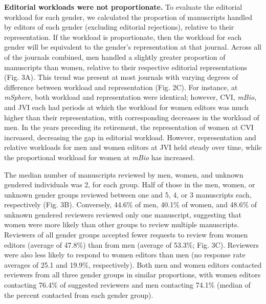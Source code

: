 \documentclass[11pt,]{article}
\begin{document}
\textbf{Editorial workloads were not proportionate.} To evaluate the
editorial workload for each gender, we calculated the proportion of
manuscripts handled by editors of each gender (excluding editorial
rejections), relative to their representation. If the workload is
proportionate, then the workload for each gender will be equivalent to
the gender's representation at that journal. Across all of the journals
combined, men handled a slightly greater proportion of manuscripts than
women, relative to their respective editorial representations (Fig. 3A).
This trend was present at most journals with varying degrees of
difference between workload and representation (Fig. 2C). For instance,
at \emph{mSphere}, both workload and representation were identical;
however, CVI, \emph{mBio}, and JVI each had periods at which the
workload for women editors was much higher than their representation,
with corresponding decreases in the workload of men. In the years
preceding its retirement, the representation of women at CVI increased,
decreasing the gap in editorial workload. However, representation and
relative workloads for men and women editors at JVI held steady over
time, while the proportional workload for women at \emph{mBio} has
increased.

The median number of manuscripts reviewed by men, women, and unknown
gendered individuals was 2, for each group. Half of those in the men,
women, or unknown gender groups reviewed between one and 5, 4, or 3
manuscripts each, respectively (Fig. 3B). Conversely, 44.6\% of men,
40.1\% of women, and 48.6\% of unknown gendered reviewers reviewed only
one manuscript, suggesting that women were more likely than other groups
to review multiple manuscripts. Reviewers of all gender groups accepted
fewer requests to review from women editors (average of 47.8\%) than
from men (average of 53.3\%; Fig. 3C). Reviewers were also less likely
to respond to women editors than men (no response rate averages of 25.1
and 19.9\%, respectively). Both men and women editors contacted
reviewers from all three gender groups in similar proportions, with
women editors contacting 76.4\% of suggested reviewers and men
contacting 74.1\% (median of the percent contacted from each gender
group).
\end{document}
